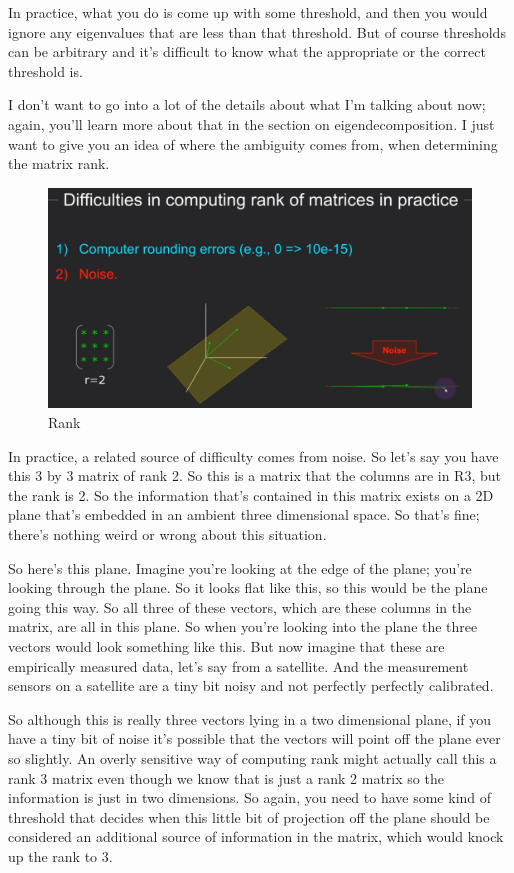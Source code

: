\documentclass[fleqn,10pt]{olplainarticle}
\theoremstyle{definition}
\theoremstyle{remark}
\begin{document}
In practice, what you do is come up with some threshold, and then you would ignore any eigenvalues that are less than that threshold. But of course thresholds can be arbitrary and it's difficult to know what the appropriate or the correct threshold is.

I don't want to go into a lot of the details about what I'm talking about now; again, you'll learn more about that in the section on eigendecomposition. I just want to give you an idea of where the ambiguity comes from, when determining the matrix rank.

\begin{figure}[ht]
	\centering
	\includegraphics[width=0.5\linewidth]{images/rank-17.png}
	\caption{Rank}
	\label{fig:rank_17}
\end{figure}

In practice, a related source of difficulty comes from noise. So let's say you have this 3 by 3 matrix of rank 2. So this is a matrix that the columns are in R3, but the rank is 2. So the information that's contained in this matrix exists on a 2D plane that's embedded in an ambient three dimensional space. So that's fine; there's nothing weird or wrong about this situation.

So here's this plane. Imagine you're looking at the edge of the plane; you're looking through the plane. So it looks flat like this, so this would be the plane going this way. So all three of these vectors, which are these columns in the matrix, are all in this plane. So when you're looking into the plane the three vectors would look something like this. But now imagine that these are empirically measured data, let's say from a satellite. And the measurement sensors on a satellite are a tiny bit noisy and not perfectly perfectly calibrated.

So although this is really three vectors lying in a two dimensional plane, if you have a tiny bit of noise it's possible that the vectors will point off the plane ever so slightly. An overly sensitive way of computing rank might actually call this a rank 3 matrix even though we know that is just a rank 2 matrix so the information is just in two dimensions. So again, you need to have some kind of threshold that decides when this little bit of projection off the plane should be considered an additional source of information in the matrix, which would knock up the rank to 3.
\end{document}
